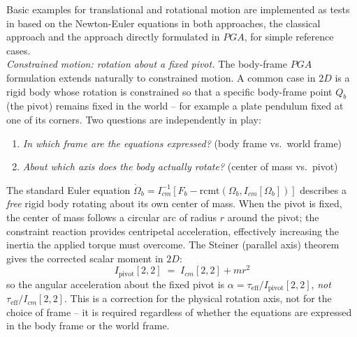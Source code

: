 Basic examples for translational and rotational motion are implemented as tests in
 based on the Newton-Euler equations in both
approaches, the classical approach and the approach directly formulated in $PGA$, for
simple reference cases. \\

\emph{Constrained motion: rotation about a fixed pivot.}
The body-frame $PGA$ formulation extends naturally to constrained motion. A common case
in $2D$ is a rigid body whose rotation is constrained so that a specific body-frame point
$Q_b$ (the pivot) remains fixed in the world -- for example a plate pendulum fixed at one
of its corners. Two questions are independently in play:
\begin{enumerate}
    \item \emph{In which frame are the equations expressed?} (body frame vs.\ world frame)
    \item \emph{About which axis does the body actually rotate?} (center of mass vs.\ pivot)
\end{enumerate}
The standard Euler equation $\dot{\Omega}_b = I_{cm}^{-1}[F_b -
\mathrm{rcmt}(\Omega_b, I_{cm}[\Omega_b])]$ describes a \emph{free} rigid body rotating
about its own center of mass. When the pivot is fixed, the center of mass follows a
circular arc of radius $r$ around the pivot; the constraint reaction provides centripetal
acceleration, effectively increasing the inertia the applied torque must overcome. The
Steiner (parallel axis) theorem gives the corrected scalar moment in $2D$:
\begin{equation}
    I_\text{pivot}[2,2] \;=\; I_{cm}[2,2] + m r^2
    \label{eq:steiner_2d}
\end{equation}
so the angular acceleration about the fixed pivot is $\alpha = \tau_\text{eff} /
I_\text{pivot}[2,2]$, \emph{not} $\tau_\text{eff}/I_{cm}[2,2]$. This is a correction for
the physical rotation axis, not for the choice of frame -- it is required regardless of
whether the equations are expressed in the body frame or the world frame. \\

